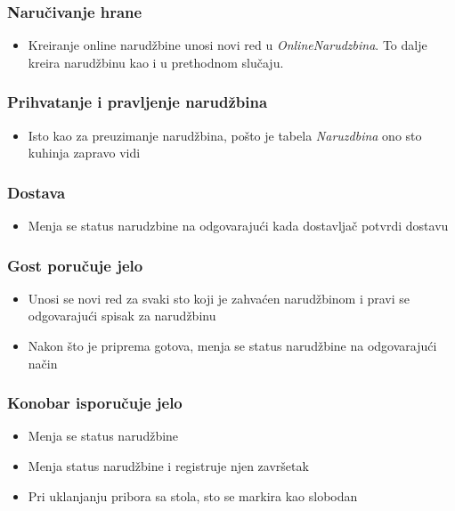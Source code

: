 \documentclass{article}
\begin{document}
\subsubsection{Naručivanje hrane}
\begin{itemize}
\item Kreiranje online narudžbine unosi novi red u \emph{OnlineNarudzbina}. To dalje kreira narudžbinu kao i u prethodnom slučaju.
\end{itemize}

\subsubsection{Prihvatanje i pravljenje narudžbina}
\begin{itemize}
\item Isto kao za preuzimanje narudžbina, pošto je tabela \emph{Naruzdbina} ono sto kuhinja zapravo vidi
\end{itemize}


\subsubsection{Dostava}
\begin{itemize}
\item Menja se status narudzbine na odgovarajući kada dostavljač potvrdi dostavu
\end{itemize}


\subsubsection{Gost poručuje jelo}
\begin{itemize}
\item Unosi se novi red za svaki sto koji je zahvaćen narudžbinom i pravi se odgovarajući spisak za narudžbinu
\item Nakon što je priprema gotova, menja se status narudžbine na odgovarajući način
\end{itemize}

\subsubsection{Konobar isporučuje jelo}
\begin{itemize}
\item Menja se status narudžbine 
\item Menja status narudžbine i registruje njen završetak
\item Pri uklanjanju pribora sa stola, sto se markira kao slobodan
\end{itemize}
\end{document}
